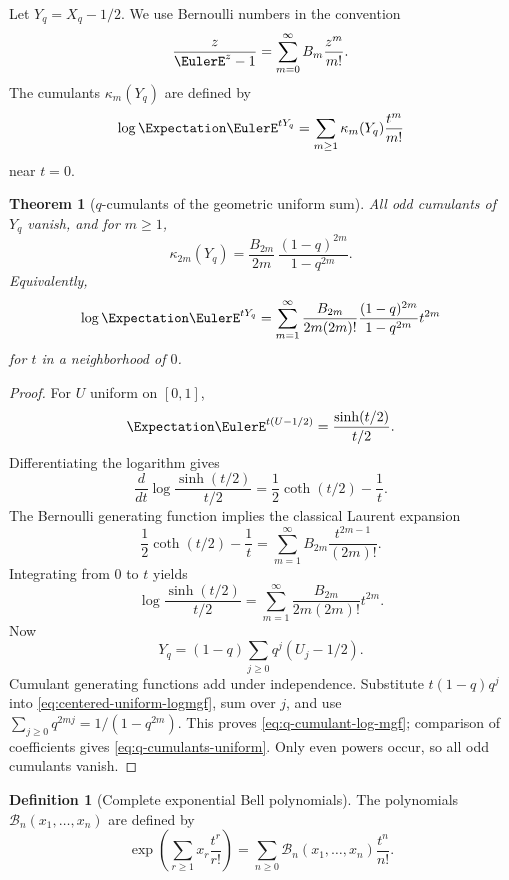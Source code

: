 \documentclass[11pt,a4paper,oneside,openany]{book}
\newtheorem{theorem}{Theorem}[chapter]
\theoremstyle{definition}
\newtheorem{definition}[definition]{Definition}
\theoremstyle{remark}
\begin{document}
Let $Y_q=X_q-1/2$.  We use Bernoulli numbers in the convention
\begin{equation}\label{eq:bernoulli-convention-fabius}
 \frac{z}{\EulerE^z-1}=\sum_{m=0}^{\infty}B_m\frac{z^m}{m!}.
\end{equation}
The cumulants $\kappa_m(Y_q)$ are defined by
\[
 \log\Expectation \EulerE^{tY_q}
 =\sum_{m\ge1}\kappa_m(Y_q)\frac{t^m}{m!}
\]
near $t=0$.

\begin{theorem}[$q$-cumulants of the geometric uniform sum]\label{thm:q-cumulants-uniform}
All odd cumulants of $Y_q$ vanish, and for $m\ge1$,
\begin{equation}\label{eq:q-cumulants-uniform}
 \kappa_{2m}(Y_q)
 =\frac{B_{2m}}{2m}\,
   \frac{(1-q)^{2m}}{1-q^{2m}}.
\end{equation}
Equivalently,
\begin{equation}\label{eq:q-cumulant-log-mgf}
 \log\Expectation \EulerE^{tY_q}
 =\sum_{m=1}^{\infty}
   \frac{B_{2m}}{2m(2m)!}
   \frac{(1-q)^{2m}}{1-q^{2m}}t^{2m}
\end{equation}
for $t$ in a neighborhood of $0$.
\end{theorem}

\begin{proof}
For $U$ uniform on $[0,1]$,
\[
 \Expectation \EulerE^{t(U-1/2)}
 =\frac{\sinh(t/2)}{t/2}.
\]
Differentiating the logarithm gives
\[
 \frac{d}{dt}\log\frac{\sinh(t/2)}{t/2}
 =\frac12\coth(t/2)-\frac1t.
\]
The Bernoulli generating function implies the classical Laurent expansion
\[
 \frac12\coth(t/2)-\frac1t
 =\sum_{m=1}^{\infty}B_{2m}\frac{t^{2m-1}}{(2m)!}.
\]
Integrating from $0$ to $t$ yields
\begin{equation}\label{eq:centered-uniform-logmgf}
 \log\frac{\sinh(t/2)}{t/2}
 =\sum_{m=1}^{\infty}
   \frac{B_{2m}}{2m(2m)!}t^{2m}.
\end{equation}
Now
\[
 Y_q=(1-q)\sum_{j\ge0}q^j(U_j-1/2).
\]
Cumulant generating functions add under independence.  Substitute
$t(1-q)q^j$ into \eqref{eq:centered-uniform-logmgf}, sum over $j$, and use
$\sum_{j\ge0}q^{2mj}=1/(1-q^{2m})$.  This proves
\eqref{eq:q-cumulant-log-mgf}; comparison of coefficients gives
\eqref{eq:q-cumulants-uniform}.  Only even powers occur, so all odd cumulants vanish.
\end{proof}

\begin{definition}[Complete exponential Bell polynomials]
The polynomials $\mathcal B_n(x_1,\ldots,x_n)$ are defined by
\begin{equation}\label{eq:complete-bell-definition}
 \exp\!\left(\sum_{r\ge1}x_r\frac{t^r}{r!}\right)
 =\sum_{n\ge0}\mathcal B_n(x_1,\ldots,x_n)\frac{t^n}{n!}.
\end{equation}
\end{definition}
\end{document}
